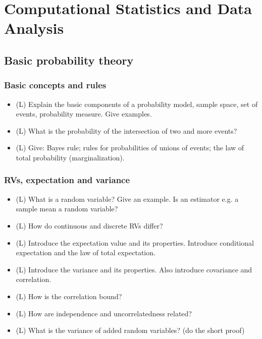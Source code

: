 \section{Computational Statistics and Data Analysis}

\subsection*{Basic probability theory}

\subsubsection*{Basic concepts and rules}
\begin{itemize}
    \item (L) Explain the basic components of a probability model, sample space, set of events, probability measure. Give examples.
    \answerboxM
    \item (L) What is the probability of the intersection of two and more events?
    \answerboxM
    \item (L) Give: Bayes rule; rules for probabilities of unions of events; the law of total probability (marginalization).
    \answerboxL
\end{itemize}

\subsubsection*{RVs, expectation and variance}
\begin{itemize}
    \item (L) What is a random variable? Give an example. Is an estimator e.g. a sample mean a random variable?
    \answerboxM
    \item (L) How do continuous and discrete RVs differ?
    \answerboxM
    \item (L) Introduce the expectation value and its properties. Introduce conditional expectation and the law of total expectation.
    \answerboxL
    \item (L) Introduce the variance and its properties. Also introduce covariance and correlation.
    \answerboxL
    \item (L) How is the correlation bound?
    \answerboxM
    \item (L) How are independence and uncorrelatedness related?
    \answerboxM
    \item (L) What is the variance of added random variables? (do the short proof)
    \answerboxL
\end{itemize}
